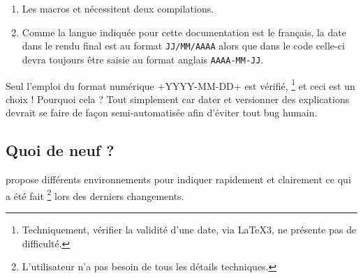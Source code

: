 \begin{tdocimportant}
    \leavevmode

    \begin{enumerate}
        \item Les macros  et  nécessitent deux compilations.

        \item Comme la langue indiquée pour cette documentation est le français, la date dans le rendu final est au format \texttt{JJ/MM/AAAA} alors que dans le code celle-ci devra toujours être saisie au format anglais \texttt{AAAA-MM-JJ}.
    \end{enumerate}
\end{tdocimportant}


\begin{tdocwarn}
    Seul l'emploi du format numérique \tdocinlatex+YYYY-MM-DD+ est vérifié,
    \footnote{
        Techniquement, vérifier la validité d'une date, via \LaTeX3, ne présente pas de difficulté.
    }
    et ceci est un choix ! Pourquoi cela ? Tout simplement car dater et versionner des explications devrait se faire de façon semi-automatisée afin d'éviter tout bug humain.
\end{tdocwarn}


\subsection{Quoi de neuf ?}

 propose différents environnements pour indiquer rapidement et clairement ce qui a été fait
\footnote{
    L'utilisateur n'a pas besoin de tous les détails techniques.
}
lors des derniers changements.


\begin{tdocexa}
    \leavevmode

\end{tdocexa}




\begin{tdocexa}
    \leavevmode

\end{tdocexa}


